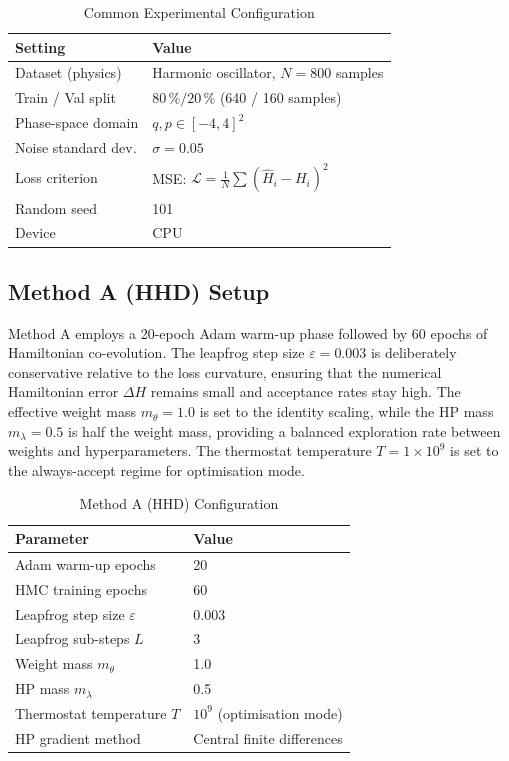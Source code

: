 \documentclass[12pt,a4paper]{article}
\begin{document}
\begin{table}[tb]
\centering
\caption{Common Experimental Configuration}
\label{tab:common_setup}
\renewcommand{\arraystretch}{1.2}
\begin{tabular}{ll}
\toprule
Setting & Value \\
\midrule
Dataset (physics)    & Harmonic oscillator, $N = 800$ samples \\
Train / Val split    & $80\,\% / 20\,\%$ (640 / 160 samples) \\
Phase-space domain   & $q, p \in [-4, 4]^2$ \\
Noise standard dev.  & $\sigma = 0.05$ \\
Loss criterion       & MSE: $\mathcal{L} = \frac{1}{N}\sum(\hat{H}_i - H_i)^2$ \\
Random seed          & 101 \\
Device               & CPU \\
\bottomrule
\end{tabular}
\end{table}

\subsection{Method A (HHD) Setup}

Method A employs a 20-epoch Adam warm-up phase followed by 60 epochs
of Hamiltonian co-evolution.  The leapfrog step size $\varepsilon = 0.003$
is deliberately conservative relative to the loss curvature, ensuring
that the numerical Hamiltonian error $\Delta H$ remains small and
acceptance rates stay high.  The effective weight mass $m_\theta = 1.0$
is set to the identity scaling, while the HP mass $m_\lambda = 0.5$
is half the weight mass, providing a balanced exploration rate between
weights and hyperparameters.  The thermostat temperature $T = 1 \times 10^9$
is set to the always-accept regime for optimisation mode.

\begin{table}[tb]
\centering
\caption{Method A (HHD) Configuration}
\label{tab:setup_a}
\renewcommand{\arraystretch}{1.2}
\begin{tabular}{ll}
\toprule
Parameter & Value \\
\midrule
Adam warm-up epochs             & 20 \\
HMC training epochs             & 60 \\
Leapfrog step size $\varepsilon$ & 0.003 \\
Leapfrog sub-steps $L$          & 3 \\
Weight mass $m_\theta$          & 1.0 \\
HP mass $m_\lambda$             & 0.5 \\
Thermostat temperature $T$      & $10^9$ (optimisation mode) \\
HP gradient method              & Central finite differences \\
\bottomrule
\end{tabular}
\end{table}
\end{document}
